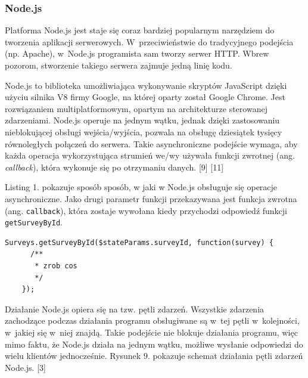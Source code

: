 \documentclass[12pt,a4paper,notitlepage]{article}
\begin{document}
\subsubsection{Node.js}
Platforma  Node.js jest staje się coraz bardziej popularnym narzędziem do tworzenia aplikacji serwerowych. W~przeciwieństwie do tradycyjnego podejścia (np. Apache), w~Node.js programista sam tworzy serwer HTTP. Wbrew pozorom, stworzenie takiego serwera zajmuje jedną linię kodu.
\par Node.js to biblioteka umożliwiająca wykonywanie skryptów JavaScript dzięki użyciu silnika V8 firmy Google, na której oparty został Google Chrome. Jest rozwiązaniem multiplatformowym, opartym na architekturze sterowanej zdarzeniami. Node.js operuje na jednym wątku, jednak dzięki zastosowaniu nieblokującej obsługi wejścia/wyjścia, pozwala na obsługę dziesiątek tysięcy równoległych połączeń do serwera. Takie asynchroniczne podejście wymaga, aby każda operacja wykorzystująca strumień we/wy używała funkcji zwrotnej (ang. \textit{callback}), która wykonuje się po otrzymaniu danych. [9] [11]
\par Listing 1. pokazuje sposób sposób, w jaki w Node.js obsługuje się operacje asynchroniczne. Jako drugi parametr funkcji przekazywana jest funkcja zwrotna (ang. \texttt{callback}), która zostaje wywołana kiedy przychodzi odpowiedź funkcji \texttt{getSurveyById}.
\begin{lstlisting}[caption=Przykład użycia funkcji zwrotnej w~pobraniu danych z~bazy danych. ]
Surveys.getSurveyById($stateParams.surveyId, function(survey) {
      /**
       * zrob cos
       */
    });
\end{lstlisting}
\par Działanie Node.js opiera się na tzw. pętli zdarzeń. Wszystkie zdarzenia zachodzące podczas działania programu obsługiwane są w~tej pętli w~kolejności, w~jakiej się w~niej znajdą. Takie podejście nie blokuje działania programu, więc mimo faktu, że Node.js działa na jednym wątku, możliwe wysłanie odpowiedzi do wielu klientów jednocześnie. Rysunek 9. pokazuje schemat działania pętli zdarzeń Node.js. [3]
\end{document}
